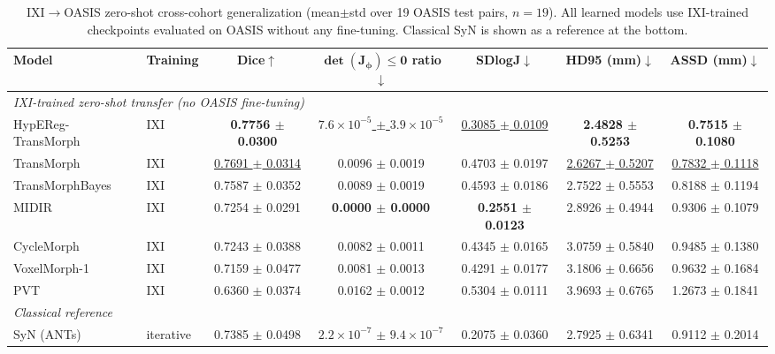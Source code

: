 \documentclass[jimaging,article,submit,pdftex,moreauthors]{Definitions/mdpi}
\begin{document}
\begin{table}[H]
\caption{IXI\(\to\)OASIS zero-shot cross-cohort generalization (mean\(\pm\)std over 19 OASIS test pairs, \(n{=}19\)). All learned models use IXI-trained checkpoints evaluated on OASIS without any fine-tuning. Classical SyN is shown as a reference at the bottom.\label{tab:oasis_zeroshot}}
\centering
\scriptsize
\setlength{\tabcolsep}{3pt}
\begin{tabularx}{\textwidth}{llccccc}
\toprule
\textbf{Model} & \textbf{Training} & \textbf{Dice\(\uparrow\)} & \(\boldsymbol{\det(J_\phi)\le 0}\) \textbf{ratio\(\downarrow\)} & \textbf{SDlogJ\(\downarrow\)} & \textbf{HD95 (mm)\(\downarrow\)} & \textbf{ASSD (mm)\(\downarrow\)}\\
\midrule
\multicolumn{7}{l}{\textit{IXI-trained zero-shot transfer (no OASIS fine-tuning)}}\\
HypEReg-TransMorph & IXI & \textbf{0.7756 \(\pm\) 0.0300} & \underline{\(7.6\times10^{-5}\) \(\pm\) \(3.9\times10^{-5}\)} & \underline{0.3085 \(\pm\) 0.0109} & \textbf{2.4828 \(\pm\) 0.5253} & \textbf{0.7515 \(\pm\) 0.1080} \\
TransMorph & IXI & \underline{0.7691 \(\pm\) 0.0314} & 0.0096 \(\pm\) 0.0019 & 0.4703 \(\pm\) 0.0197 & \underline{2.6267 \(\pm\) 0.5207} & \underline{0.7832 \(\pm\) 0.1118} \\
TransMorphBayes & IXI & 0.7587 \(\pm\) 0.0352 & 0.0089 \(\pm\) 0.0019 & 0.4593 \(\pm\) 0.0186 & 2.7522 \(\pm\) 0.5553 & 0.8188 \(\pm\) 0.1194 \\
MIDIR & IXI & 0.7254 \(\pm\) 0.0291 & \textbf{0.0000 \(\pm\) 0.0000} & \textbf{0.2551 \(\pm\) 0.0123} & 2.8926 \(\pm\) 0.4944 & 0.9306 \(\pm\) 0.1079 \\
CycleMorph & IXI & 0.7243 \(\pm\) 0.0388 & 0.0082 \(\pm\) 0.0011 & 0.4345 \(\pm\) 0.0165 & 3.0759 \(\pm\) 0.5840 & 0.9485 \(\pm\) 0.1380 \\
VoxelMorph-1 & IXI & 0.7159 \(\pm\) 0.0477 & 0.0081 \(\pm\) 0.0013 & 0.4291 \(\pm\) 0.0177 & 3.1806 \(\pm\) 0.6656 & 0.9632 \(\pm\) 0.1684 \\
PVT & IXI & 0.6360 \(\pm\) 0.0374 & 0.0162 \(\pm\) 0.0012 & 0.5304 \(\pm\) 0.0111 & 3.9693 \(\pm\) 0.6765 & 1.2673 \(\pm\) 0.1841 \\
\midrule
\multicolumn{7}{l}{\textit{Classical reference}}\\
SyN (ANTs) & iterative & 0.7385 \(\pm\) 0.0498 & \(2.2\times10^{-7}\) \(\pm\) \(9.4\times10^{-7}\) & 0.2075 \(\pm\) 0.0360 & 2.7925 \(\pm\) 0.6341 & 0.9112 \(\pm\) 0.2014 \\
\bottomrule
\end{tabularx}
\end{table}
\end{document}
